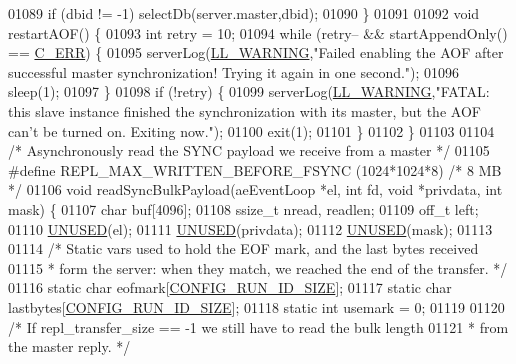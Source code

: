 \begin{DoxyCode}
{{{{{{{{{{{{{{{{{{{{{{{{{{{{{{{{{{{{{{{{01089     \textcolor{keywordflow}{if} (dbid != -1) selectDb(server.master,dbid);
01090 \}
01091 
01092 \textcolor{keywordtype}{void} restartAOF() \{
01093     \textcolor{keywordtype}{int} retry = 10;
01094     \textcolor{keywordflow}{while} (retry-- && startAppendOnly() == \hyperlink{server_8h_af98ac28d5f4d23d7ed5985188e6fb7d1}{C\_ERR}) \{
01095         serverLog(\hyperlink{server_8h_a31229b9334bba7d6be2a72970967a14b}{LL\_WARNING},\textcolor{stringliteral}{"Failed enabling the AOF after successful master
       synchronization! Trying it again in one second."});
01096         sleep(1);
01097     \}
01098     \textcolor{keywordflow}{if} (!retry) \{
01099         serverLog(\hyperlink{server_8h_a31229b9334bba7d6be2a72970967a14b}{LL\_WARNING},\textcolor{stringliteral}{"FATAL: this slave instance finished the synchronization with
       its master, but the AOF can't be turned on. Exiting now."});
01100         exit(1);
01101     \}
01102 \}
01103 
01104 \textcolor{comment}{/* Asynchronously read the SYNC payload we receive from a master */}
01105 \textcolor{preprocessor}{#}\textcolor{preprocessor}{define} \textcolor{preprocessor}{REPL\_MAX\_WRITTEN\_BEFORE\_FSYNC} \textcolor{preprocessor}{(}1024\textcolor{preprocessor}{*}1024\textcolor{preprocessor}{*}8\textcolor{preprocessor}{)} \textcolor{comment}{/* 8 MB */}
01106 \textcolor{keywordtype}{void} readSyncBulkPayload(aeEventLoop *el, \textcolor{keywordtype}{int} fd, \textcolor{keywordtype}{void} *privdata, \textcolor{keywordtype}{int} mask) \{
01107     \textcolor{keywordtype}{char} buf[4096];
01108     ssize\_t nread, readlen;
01109     off\_t left;
01110     \hyperlink{server_8h_ae7c9dc8f13568a9c856573751f1ee1ec}{UNUSED}(el);
01111     \hyperlink{server_8h_ae7c9dc8f13568a9c856573751f1ee1ec}{UNUSED}(privdata);
01112     \hyperlink{server_8h_ae7c9dc8f13568a9c856573751f1ee1ec}{UNUSED}(mask);
01113 
01114     \textcolor{comment}{/* Static vars used to hold the EOF mark, and the last bytes received}
01115 \textcolor{comment}{     * form the server: when they match, we reached the end of the transfer. */}
01116     \textcolor{keyword}{static} \textcolor{keywordtype}{char} eofmark[\hyperlink{server_8h_aba6794fa3ee28f85165eaed93190f1df}{CONFIG\_RUN\_ID\_SIZE}];
01117     \textcolor{keyword}{static} \textcolor{keywordtype}{char} lastbytes[\hyperlink{server_8h_aba6794fa3ee28f85165eaed93190f1df}{CONFIG\_RUN\_ID\_SIZE}];
01118     \textcolor{keyword}{static} \textcolor{keywordtype}{int} usemark = 0;
01119 
01120     \textcolor{comment}{/* If repl\_transfer\_size == -1 we still have to read the bulk length}
01121 \textcolor{comment}{     * from the master reply. */}
}}}}}}}}}}}}}}}}}}}}}}}}}}}}}}}}}}}}}}}}
\end{DoxyCode}
